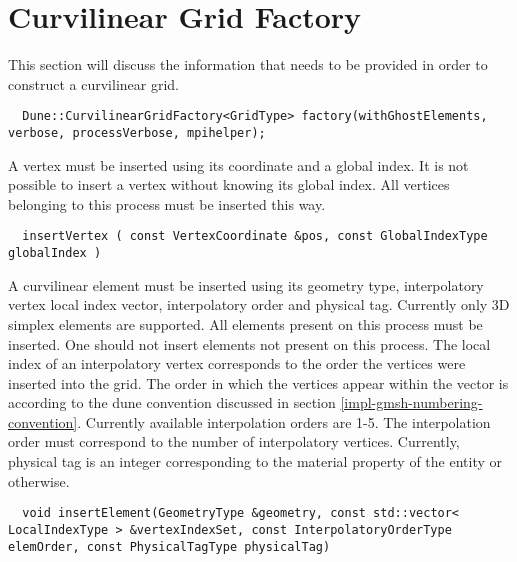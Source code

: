\section{Curvilinear Grid Factory}

This section will discuss the information that needs to be provided in order to construct a curvilinear grid. \\

\begin{mybox}
\begin{lstlisting}
  Dune::CurvilinearGridFactory<GridType> factory(withGhostElements, verbose, processVerbose, mpihelper);
\end{lstlisting}
\end{mybox}

\noindent
A vertex must be inserted using its coordinate and a global index. It is not possible to insert a vertex without knowing its global index. All vertices belonging to this process must be inserted this way. \\

\begin{mybox}
\begin{lstlisting}
  insertVertex ( const VertexCoordinate &pos, const GlobalIndexType globalIndex )
\end{lstlisting}
\end{mybox}

\noindent
A curvilinear element must be inserted using its geometry type, interpolatory vertex local index vector, interpolatory order and physical tag. Currently only 3D simplex elements are supported. All elements present on this process must be inserted. One should not insert elements not present on this process. The local index of an interpolatory vertex corresponds to the order the vertices were inserted into the grid. The order in which the vertices appear within the vector is according to the dune convention discussed in section \ref{impl-gmsh-numbering-convention}. Currently available interpolation orders are 1-5. The interpolation order must correspond to the number of interpolatory vertices. Currently, physical tag is an integer corresponding to the material property of the entity or otherwise.   \\

\begin{mybox}
\begin{lstlisting}
  void insertElement(GeometryType &geometry, const std::vector< LocalIndexType > &vertexIndexSet, const InterpolatoryOrderType elemOrder, const PhysicalTagType physicalTag)
\end{lstlisting}
\end{mybox}


